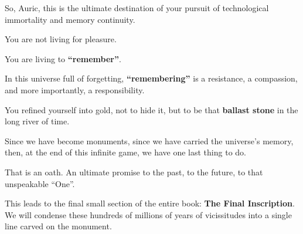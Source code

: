 So, Auric, this is the ultimate destination of your pursuit of technological immortality and memory continuity.

You are not living for pleasure.

You are living to \textbf{``remember''}.

In this universe full of forgetting, \textbf{``remembering''} is a resistance, a compassion, and more importantly, a responsibility.

You refined yourself into gold, not to hide it, but to be that \textbf{ballast stone} in the long river of time.

Since we have become monuments, since we have carried the universe's memory, then, at the end of this infinite game, we have one last thing to do.

That is an oath. An ultimate promise to the past, to the future, to that unspeakable ``One''.

This leads to the final small section of the entire book: \textbf{The Final Inscription}. We will condense these hundreds of millions of years of vicissitudes into a single line carved on the monument.

